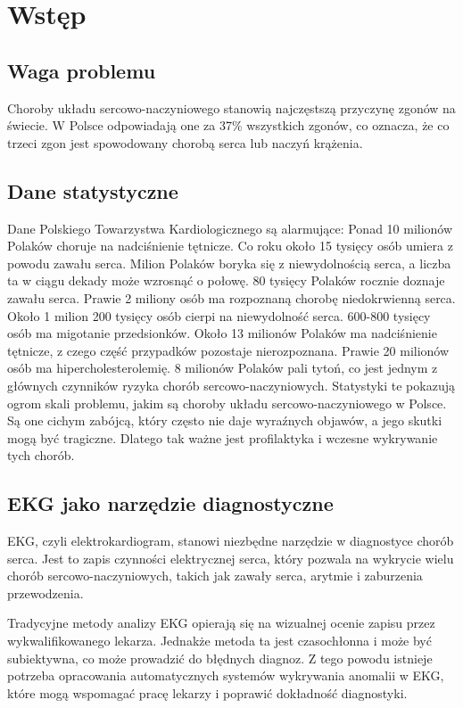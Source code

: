 \documentclass[12pt,a4paper]{article}
\begin{document}
\newpage

\tableofcontents

\newpage
\section{Wstęp}

\subsection{Waga problemu}
Choroby układu sercowo-naczyniowego stanowią najczęstszą przyczynę zgonów na świecie. W Polsce odpowiadają one za 37\% wszystkich zgonów, co oznacza, że co trzeci zgon jest spowodowany chorobą serca lub naczyń krążenia.

\subsection{Dane statystyczne}
Dane Polskiego Towarzystwa Kardiologicznego \cite{dane-o-problemach-z-sercem} są alarmujące: Ponad 10 milionów Polaków choruje na nadciśnienie tętnicze.
Co roku około 15 tysięcy osób umiera z powodu zawału serca.
Milion Polaków boryka się z niewydolnością serca, a liczba ta w ciągu dekady może wzrosnąć o połowę.
80 tysięcy Polaków rocznie doznaje zawału serca.
Prawie 2 miliony osób ma rozpoznaną chorobę niedokrwienną serca.
Około 1 milion 200 tysięcy osób cierpi na niewydolność serca.
600-800 tysięcy osób ma migotanie przedsionków.
Około 13 milionów Polaków ma nadciśnienie tętnicze, z czego część przypadków pozostaje nierozpoznana.
Prawie 20 milionów osób ma hipercholesterolemię.
8 milionów Polaków pali tytoń, co jest jednym z głównych czynników ryzyka chorób sercowo-naczyniowych.
Statystyki te pokazują ogrom skali problemu, jakim są choroby układu sercowo-naczyniowego w Polsce. Są one cichym zabójcą, który często nie daje wyraźnych objawów, a jego skutki mogą być tragiczne. Dlatego tak ważne jest profilaktyka i wczesne wykrywanie tych chorób. 

\subsection{EKG jako narzędzie diagnostyczne}
EKG, czyli elektrokardiogram, stanowi niezbędne narzędzie w diagnostyce chorób serca. Jest to zapis czynności elektrycznej serca, który pozwala na wykrycie wielu chorób sercowo-naczyniowych, takich jak zawały serca, arytmie i zaburzenia przewodzenia.

Tradycyjne metody analizy EKG opierają się na wizualnej ocenie zapisu przez wykwalifikowanego lekarza. Jednakże metoda ta jest czasochłonna i może być subiektywna, co może prowadzić do błędnych diagnoz. Z tego powodu istnieje potrzeba opracowania automatycznych systemów wykrywania anomalii w EKG, które mogą wspomagać pracę lekarzy i poprawić dokładność diagnostyki.
\end{document}
